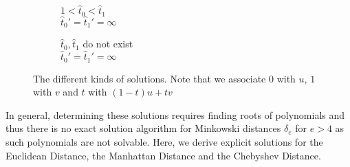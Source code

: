 \begin{figure}
\begin{subfigure}[b]{0.3\textwidth}
        \caption{\(1 < \hat t_0 < \hat t_1\)\\ \(\hat t_0' =  \hat t_1' = \infty\)}
    \end{subfigure}

    \begin{subfigure}[b]{0.3\textwidth}
        \centering
        \caption{\(\hat t_0, \hat t_1\) do not exist\\ \(\hat t_0' = \hat t_1' = \infty\)}
    \end{subfigure}
    \caption{The different kinds of solutions. Note that we associate \(0\) with \(u\), \(1\) with \(v\) and \(t\) with \((1-t)u + tv\)}
    \label{fig:solution_kinds}
\end{figure}

In general, determining these solutions requires finding roots of polynomials and thus there is no exact solution algorithm for Minkowski distances \(\delta_e\) for \(e > 4\) as such polynomials are not solvable. Here, we derive explicit solutions for the Euclidean Distance, the Manhattan Distance and the Chebyshev Distance. 


